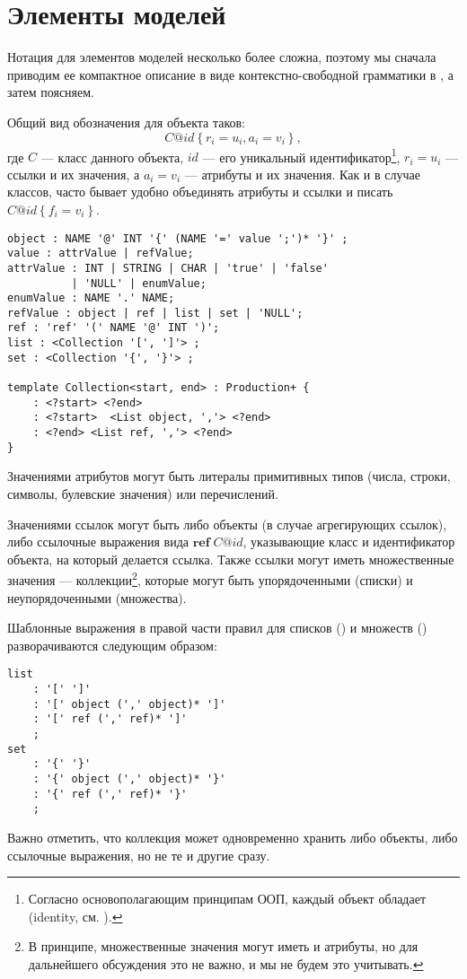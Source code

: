 \section{Элементы моделей}

\newcommand{\obj}[3]{#1@#2\left\{#3\right\}}%
\newcommand{\refv}[2]{\mathbf{ref}\; #1@#2}%
%
Нотация для элементов моделей несколько более сложна, поэтому мы сначала приводим ее компактное описание в виде контекстно-свободной грамматики в , а затем поясняем.

Общий вид обозначения для объекта таков: 
\[\obj{C}{id}{r_i = u_i, a_i = v_i},\]
 где $C$ --- класс данного объекта, $id$ --- его уникальный идентификатор\footnote{Согласно основополагающим принципам ООП, каждый объект обладает  (identity, см. \cite{Booch}).}, $r_i = u_i$ --- ссылки и их значения, а $a_i = v_i$ --- атрибуты и их значения. Как и в случае классов, часто бывает удобно объединять атрибуты и ссылки и писать $\obj{C}{id}{f_i = v_i}$.

\begin{lstlisting}[label=modelGrammar,float=htbp,caption={Грамматика, описывающая запись моделей в виде текста}]
object : NAME '@' INT '{' (NAME '=' value ';')* '}' ;
value : attrValue | refValue;
attrValue : INT | STRING | CHAR | 'true' | 'false' 
          | 'NULL' | enumValue;
enumValue : NAME '.' NAME;
refValue : object | ref | list | set | 'NULL';
ref	: 'ref' '(' NAME '@' INT ')';
list : <Collection '[', ']'> ;
set : <Collection '{', '}'> ;

template Collection<start, end> : Production+ {
	: <?start> <?end>
	: <?start>  <List object, ','> <?end>
	: <?end> <List ref, ','> <?end>
}
\end{lstlisting}

Значениями атрибутов могут быть литералы примитивных типов (числа, строки, символы, булевские значения) или перечислений.

Значениями ссылок могут быть либо объекты (в случае агрегирующих ссылок), либо ссылочные выражения вида $\refv{C}{id}$, указывающие класс и идентификатор объекта, на который делается ссылка. Также ссылки могут иметь множественные значения --- коллекции\footnote{В принципе, множественные значения могут иметь и атрибуты, но для дальнейшего обсуждения это не важно, и мы не будем это учитывать.}, которые могут быть упорядоченными (списки) и неупорядоченными (множества).

Шаблонные выражения в правой части правил для списков () и множеств () разворачиваются следующим образом:
\begin{lstlisting}
list
	: '[' ']'
	: '[' object (',' object)* ']'
	: '[' ref (',' ref)* ']'
	;
set
	: '{' '}'
	: '{' object (',' object)* '}'
	: '{' ref (',' ref)* '}'
	;
\end{lstlisting}
Важно отметить, что коллекция может одновременно хранить либо объекты, либо ссылочные выражения, но не те и другие сразу.


